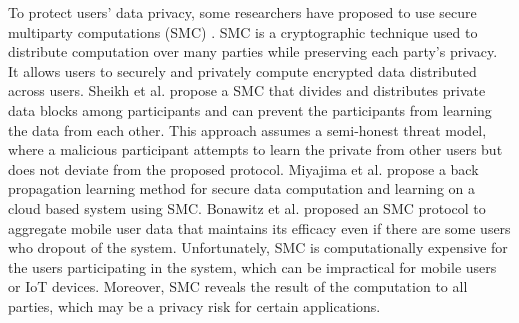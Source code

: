 \documentclass[conference]{IEEEtran}
\begin{document}

To protect users' data privacy, some researchers have proposed to use secure multiparty computations (SMC) 
\cite{vaidya2003leveraging,7040943, ma2018privacy}. 
SMC is a cryptographic technique used to distribute computation over many parties while preserving each party's privacy. It allows
users to securely and privately compute encrypted data distributed across users. 
Sheikh et al. \cite{sheikh2010distributed} propose a SMC that divides and distributes private data blocks among participants and can
prevent the participants from learning the data from  each other. This approach assumes a semi-honest threat model,
where a malicious  participant attempts to learn the private from other users but does not deviate from the proposed
protocol. 
Miyajima et al. \cite{miyajima2016new} propose a back propagation learning method for secure data computation and learning on a cloud
based system using SMC. %
Bonawitz et al. \cite{bonawitz2017practical}  proposed an SMC protocol to aggregate mobile user data that maintains its efficacy even
if there are some users who dropout of the system.  Unfortunately, SMC is computationally expensive for the users participating in the
system, which can be impractical for mobile users or IoT devices. Moreover, SMC reveals the result of the computation to all parties,
which may be a privacy risk for certain applications. 

\end{document}
